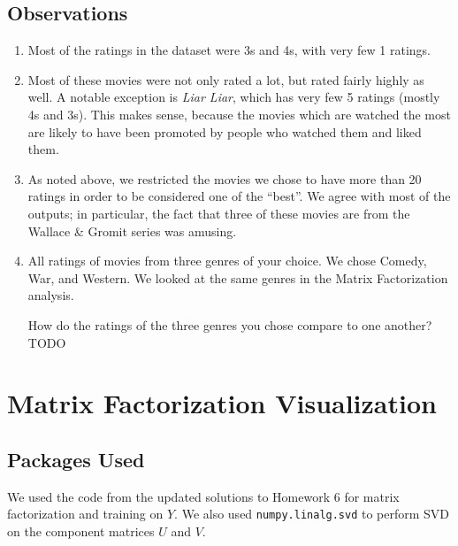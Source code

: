 \subsection{Observations}
\begin{enumerate}
    \item Most of the ratings in the dataset were 3s and 4s, with very few 1 ratings.  
    \item Most of these movies were not only rated a lot, but rated fairly highly as well.  A notable exception is \emph{Liar Liar}, which has very few 5 ratings (mostly 4s and 3s).  This makes sense, because the movies which are watched the most are likely to have been promoted by people who watched them and liked them.
    \item As noted above, we restricted the movies we chose to have more than 20 ratings in order to be considered one of the ``best''.  We agree with most of the outputs; in particular, the fact that three of these movies are from the Wallace \& Gromit series was amusing.
    \item All ratings of movies from three genres of your choice.  We chose Comedy, War, and Western.  We looked at the same genres in the Matrix Factorization analysis.

    How do the ratings of the three genres you chose compare to one another? TODO
\end{enumerate}



\newpage

\section{Matrix Factorization Visualization}

\subsection{Packages Used}
We used the code from the updated solutions to Homework 6 for matrix factorization and training on $Y$. We also used {\tt numpy.linalg.svd} to perform SVD on the component matrices $U$ and $V$.

